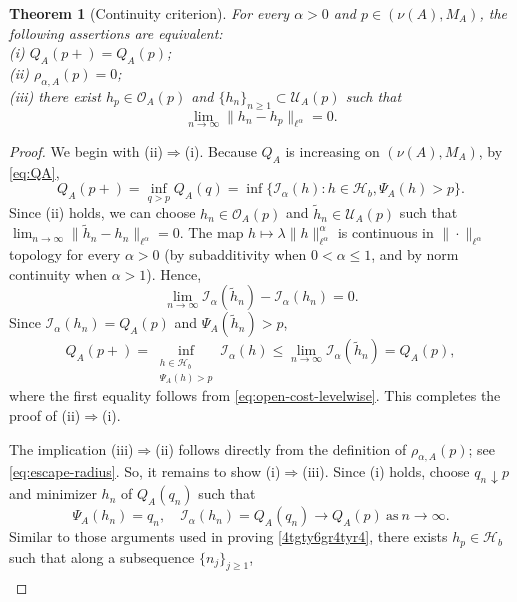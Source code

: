 \documentclass[a4paper, 11pt]{article}
\newcommand{\1}{\mathbf 1}
\theoremstyle{plain}
\newtheorem{theorem}{Theorem}[section]
\begin{document}
\begin{theorem}[Continuity criterion]
\label{thm:optimizer-escape}
For every \(\alpha>0\) and \(p\in(\nu(A),M_A)\), the following assertions are equivalent:\\
(i) \(Q_A(p+)=Q_A(p)\);\\
(ii) \(\rho_{\alpha,A}(p)=0\);\\
(iii) there exist \(h_p\in\mathcal O_A(p)\) and \(\{h_n\}_{n\geq1}\subset\mathcal U_A(p)\) such that
  \[
    \lim_{n\to\infty}\|h_n-h_p\|_{\ell^\alpha}=0.
  \]
\end{theorem}

\begin{proof}
We begin with \textup{(ii)}\(\Rightarrow\)\textup{(i)}. Because \(Q_A\) is increasing on \((\nu(A),M_A)\), by \eqref{eq:QA},
\begin{equation}\label{eq:open-cost-levelwise}
  Q_A(p+)
  =\inf_{q>p}Q_A(q)
  =\inf\{\mathcal{I_{\alpha}}(h): h\in\mathcal{H}_b, \Psi_A(h)>p\}.
\end{equation}
Since (ii) holds, we can choose
\(h_n\in\mathcal O_A(p)\) and
\(\widetilde h_n\in\mathcal U_A(p)\) such that
\(\lim_{n\to\infty}\|\widetilde h_n-h_n\|_{\ell^\alpha}=0\). The map
\(h\mapsto\lambda\|h\|_{\ell^\alpha}^\alpha\) is continuous in $\|\cdot\|_{\ell^\alpha}$
topology for every \(\alpha>0\) (by subadditivity when
\(0<\alpha\leq1\), and by norm continuity when \(\alpha>1\)). Hence,
\[
  \lim_{n\to\infty}\mathcal{I_{\alpha}}(\widetilde h_n)-\mathcal{I_{\alpha}}(h_n)=0.
\]
Since
\(\mathcal{I_{\alpha}}(h_n)=Q_A(p)\) and \(\Psi_A(\widetilde h_n)>p\),
\[
  Q_A(p+)
  =\inf_{\substack{h\in\mathcal{H}_b\\\Psi_A(h)>p}}\mathcal{I_{\alpha}}(h)
  \leq\lim_{n\to\infty}\mathcal{I_{\alpha}}(\widetilde h_n)
  =Q_A(p),
\]
where the first equality follows from \eqref{eq:open-cost-levelwise}. This completes the proof of \textup{(ii)}\(\Rightarrow\)\textup{(i)}.
\par
The implication \textup{(iii)}\(\Rightarrow\)\textup{(ii)} follows directly from the definition of $\rho_{\alpha,A}(p)$; see \eqref{eq:escape-radius}. So, it remains to show \textup{(i)}\(\Rightarrow\)\textup{(iii)}. Since (i)
holds, choose \(q_n\downarrow p\) and minimizer \(h_n\) of \(Q_A(q_n)\)
such that
\[
  \Psi_A(h_n)=q_n,
  \quad
  \mathcal{I_{\alpha}}(h_n)=Q_A(q_n)\to Q_A(p)~\text{as}~n\to\infty.
\]
Similar to those arguments used in proving \eqref{4tgty6gr4tyr4}, there exists $h_p\in\mathcal{H}_b$ such that along a subsequence $\{n_j\}_{j\geq1}$,
\begin{align}\label{4tgty6yr4}

\end{align}
\end{proof}
\end{document}
